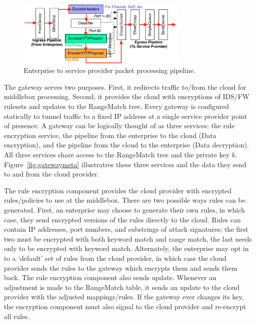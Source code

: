 \begin{figure}[t]
  \centering
  \includegraphics[width=3.25in]{fig/gatewaydiag}
  \caption[]{\label{fig:gateway} Enterprise to service provider packet processing pipeline.}
\end{figure}

The gateway serves two purposes. First, it redirects traffic to/from the cloud for middlebox processing. Second, it provides the cloud with encryptions of IDS/FW rulesets and updates to the RangeMatch tree.
Every gateway is configured statically to tunnel traffic to a fixed IP address at a single service provider point of presence.
A gateway can be logically thought of as three services: the rule encryption service, the pipeline from the enterprise to the cloud (Data encryption), and the pipeline from the cloud to the enterprise (Data decryption). 
All three services share access to the RangeMatch tree and the private key $k$.
Figure~\ref{fig:gatewaymeta} illustratres  these three services and the data they send to and from the cloud provider.

 The rule encryption component provides the cloud provider with encrypted rules/policies to use at the middlebox. 
There are two possible ways rules can be generated. First, an enterprise may choose to generate their own rules, in which case, they send encrypted versions of the rules directly to the cloud.
Rules can contain IP addresses, port numbers, and substrings of attack signatures; the first two must be encrypted with both keyword match and range match, the last needs only to be encrypted with keyword match.
Alternately, the enterprise may opt in to a `default' set of rules from the cloud provider, in which case the cloud provider sends the rules to the gateway which encrypts them and sends them back.
The rule encryption component also sends update. Whenever an adjustment is made to the RangeMatch table, it sends an update to the cloud provider with the adjusted mappings/rules.
If the gateway ever changes its key, the encryption component must also signal to the cloud provider and re-encrypt all rules.

